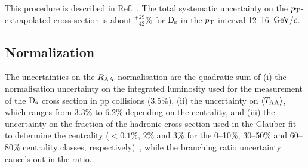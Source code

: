 This procedure is described in Ref.~\cite{Adam:2015sza}. The total 
systematic uncertainty on the $p_{\rm T}$-extrapolated cross section is about 
$^{+29}_{-42}\%$ for ${\rm D_s}$ in the $p_{\rm T}$ interval 12--16~$\mathrm{GeV}/c$.


\subsection{Normalization}
\label{sec:NormalizSyst}
The uncertainties on the $R_{\rm AA}$ normalisation are the quadratic sum of 
(i) the normalisation uncertainty on the integrated luminosity used for the measurement of the ${\rm D_s}$ cross section in pp collisions (3.5\%), 
(ii) the uncertainty on $\langle T_{\rm AA} \rangle$, which ranges from 3.3\% to 6.2\% depending on the centrality, and
(iii) the uncertainty on the fraction of the hadronic cross section used in the 
Glauber fit to determine the centrality ($<0.1\%$, $2\%$ and $3\%$ for the 0--10\%, 30--50\% 
and 60--80\% centrality classes, respectively)~\cite{Adam:2015sza}, while the branching ratio uncertainty cancels out in the 
ratio.

